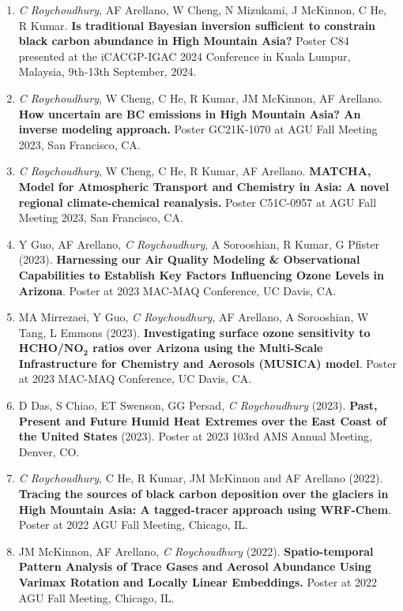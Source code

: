\documentclass[margin,line]{resume}
\begin{document}
\begin{resume}
\begin{enumerate}[topsep=1pt, partopsep=1pt, itemsep=0.5pt, parsep=0.1pt, leftmargin=15pt,label=\arabic*.]
			\item \textit{C Roychoudhury}, AF Arellano, W Cheng, N Mizukami, J McKinnon, C He, R Kumar. \textbf{Is traditional Bayesian inversion sufficient to constrain black carbon abundance in High Mountain Asia?} Poster C84 presented at the iCACGP-IGAC 2024 Conference in Kuala Lumpur, Malaysia, 9th-13th September, 2024.
			
			\item \textit{C Roychoudhury}, W Cheng, C He, R Kumar, JM McKinnon, AF Arellano. \textbf{How uncertain are BC emissions in High Mountain Asia? An inverse modeling approach.} Poster GC21K-1070 at AGU Fall Meeting 2023, San Francisco, CA. 
			
			\item \textit{C Roychoudhury}, W Cheng, C He, R Kumar, AF Arellano. \textbf{MATCHA, Model for Atmospheric Transport and Chemistry in Asia: A novel regional climate-chemical reanalysis.} Poster C51C-0957 at AGU Fall Meeting 2023, San Francisco, CA.
			
			\item Y Guo, AF Arellano, \textit{C Roychoudhury}, A Sorooshian, R Kumar, G Pfister (2023). \textbf{Harnessing our Air Quality Modeling \& Observational Capabilities to Establish Key Factors Influencing Ozone Levels in Arizona}. Poster at 2023 MAC-MAQ Conference, UC Davis, CA.
			
			\item MA Mirrezaei, Y Guo, \textit{C Roychoudhury}, AF Arellano, A Sorooshian, W Tang, L Emmons (2023). \textbf{Investigating surface ozone sensitivity to HCHO/$\mathbf{NO_2}$ ratios over Arizona using the Multi-Scale Infrastructure for Chemistry and Aerosols (MUSICA) model}. Poster at 2023 MAC-MAQ Conference, UC Davis, CA.
			
			\item D Das, S Chiao, ET Swenson, GG Persad, \textit{C Roychoudhury} (2023). \textbf{Past, Present and Future Humid Heat Extremes over the East Coast of the United States} (2023). Poster at 2023 103rd AMS Annual Meeting, Denver, CO. 
			
			\item \textit{C Roychoudhury}, C He, R Kumar, JM McKinnon and AF Arellano (2022).
			\textbf{Tracing the sources of black carbon deposition over the glaciers in High Mountain Asia: A tagged-tracer approach using WRF-Chem}. Poster at 2022 AGU Fall Meeting, Chicago, IL.
			
			\item JM McKinnon, AF Arellano, \textit{C Roychoudhury} (2022). \textbf{Spatio-temporal Pattern Analysis of Trace Gases and Aerosol Abundance Using Varimax Rotation and Locally Linear Embeddings.} Poster at 2022 AGU Fall Meeting, Chicago, IL.
			

\end{enumerate}
\end{resume}
\end{document}
